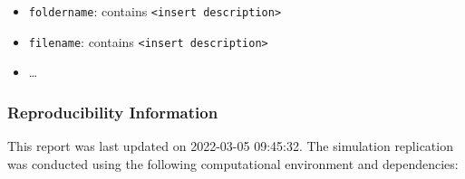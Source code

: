 \documentclass[10,a4paperpaper,]{article}
\begin{document}
\begin{itemize}
\tightlist
\item
  \texttt{foldername}: contains
  \texttt{\textless{}insert\ description\textgreater{}}
\item
  \texttt{filename}: contains
  \texttt{\textless{}insert\ description\textgreater{}}
\item
  \ldots{}
\end{itemize}

\subsubsection*{Reproducibility Information}

This report was last updated on 2022-03-05 09:45:32. The simulation
replication was conducted using the following computational environment
and dependencies:

\FloatBarrier
\end{document}
